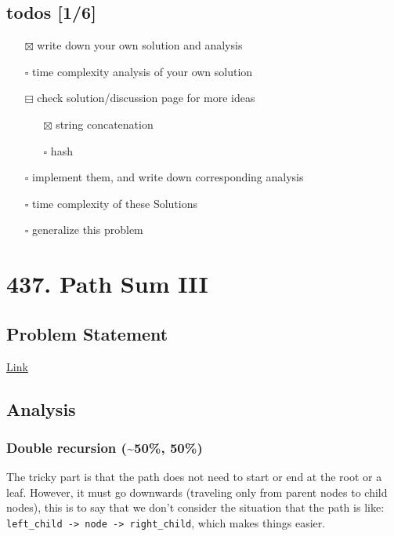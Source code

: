 \documentclass[12pt]{article}
\begin{document}
\subsection{todos [1/6]}
\label{sec:org769d6ee}
\begin{itemize}
\item[{$\boxtimes$}] write down your own solution and analysis
\item[{$\square$}] time complexity analysis of your own solution
\item[{$\boxminus$}] check solution/discussion page for more ideas
\begin{itemize}
\item[{$\boxtimes$}] string concatenation
\item[{$\square$}] hash
\end{itemize}
\item[{$\square$}] implement them, and write down corresponding analysis
\item[{$\square$}] time complexity of these Solutions
\item[{$\square$}] generalize this problem
\end{itemize}
\section{437. Path Sum III}
\label{sec:org7eedae6}
\subsection{Problem Statement}
\label{sec:orgce2de07}
\href{https://leetcode.com/problems/path-sum-iii/}{Link}
\subsection{Analysis}
\label{sec:org78a5776}
\subsubsection{Double recursion (\textasciitilde{}50\%, 50\%)}
\label{sec:org1e4f0fd}
The tricky part is that the path does not need to start or end at the root or a leaf. However, it must go downwards (traveling only from parent nodes to child nodes), this is to say that we don't consider the situation that the path is like: \texttt{left\_child -> node -> right\_child}, which makes things easier.
\end{document}
